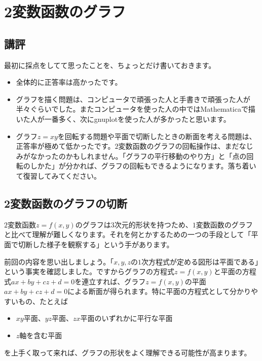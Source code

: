 \chapter{2変数函数のグラフ}


\section{講評}

最初に採点をしてて思ったことを、ちょっとだけ書いておきます。\vspace{-0.5zw}
\begin{itemize}
\item 全体的に正答率は高かったです。
\item グラフを描く問題は、コンピュータで頑張った人と手書きで頑張った人が半々ぐらいでした。またコンピュータを使った人の中ではMathematicaで描いた人が一番多く、次にgnuplotを使った人が多かったと思います。
\item グラフ$z = xy$を回転する問題や平面で切断したときの断面を考える問題は、正答率が極めて低かったです。$2$変数函数のグラフの回転操作は、まだなじみがなかったのかもしれません。「グラフの平行移動のやり方」と「点の回転のしかた」が分かれば、グラフの回転もできるようになります。落ち着いて復習してみてください。
\end{itemize}\vspace{-2zw}

\section{2変数函数のグラフの切断}

$2$変数函数$z = f(x, y)$のグラフは$3$次元的形状を持つため、$1$変数函数のグラフと比べて理解が難しくなります。それを何とかするための一つの手段として「平面で切断した様子を観察する」という手があります。

前回の内容を思い出しましょう。「$x, y, z$の$1$次方程式が定める図形は平面である」という事実を確認しました。ですからグラフの方程式$z = f(x, y)$と平面の方程式$ax + by + cz + d = 0$を連立すれば、グラフ$z = f(x, y)$の平面$ax + by + cz + d=0$による断面が得られます。特に平面の方程式として分かりやすいもの、たとえば\vspace{-0.5zw}
\begin{itemize}
\item $xy$平面、$yz$平面、$zx$平面のいずれかに平行な平面
\item $z$軸を含む平面
\end{itemize}\vspace{-0.5zw}
を上手く取って来れば、グラフの形状をよく理解できる可能性が高まります。\vspace{-0.5zw}

